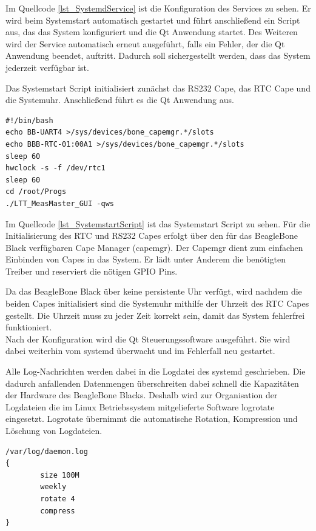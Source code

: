 Im Quellcode \ref{lst_SystemdService} ist die Konfiguration des Services zu sehen. Er wird beim Systemstart automatisch gestartet und führt anschließend ein Script aus, das das System konfiguriert und die Qt Anwendung startet. Des Weiteren wird der Service automatisch erneut ausgeführt, falls ein Fehler, der die Qt Anwendung beendet, auftritt. Dadurch soll sichergestellt werden, dass das System jederzeit verfügbar ist.\ 

Das Systemstart Script initialisiert zunächst das RS232 Cape, das \ac{RTC} Cape und die Systemuhr. Anschließend führt es die Qt Anwendung aus.\\ 

\begin{lstlisting}[caption={Systemstart Script},label=lst_SystemstartScript]
#!/bin/bash
echo BB-UART4 >/sys/devices/bone_capemgr.*/slots
echo BBB-RTC-01:00A1 >/sys/devices/bone_capemgr.*/slots
sleep 60
hwclock -s -f /dev/rtc1
sleep 60
cd /root/Progs
./LTT_MeasMaster_GUI -qws
\end{lstlisting}

Im Quellcode \ref{lst_SystemstartScript} ist das Systemstart Script zu sehen. Für die Initialisierung des RTC und RS232 Capes erfolgt über den für das BeagleBone Black verfügbaren Cape Manager (capemgr). Der Capemgr \cite{Capemgr} dient zum einfachen Einbinden von Capes in das System. Er lädt unter Anderem die benötigten Treiber und reserviert die nötigen \ac{GPIO} Pins.\ 

Da das BeagleBone Black über keine persistente Uhr verfügt, wird nachdem die beiden Capes initialisiert sind die Systemuhr mithilfe der Uhrzeit des RTC Capes gestellt. Die Uhrzeit muss zu jeder Zeit korrekt sein, damit das System fehlerfrei funktioniert.\\
Nach der Konfiguration wird die Qt Steuerungssoftware ausgeführt. Sie wird dabei weiterhin vom systemd überwacht und im Fehlerfall neu gestartet.\ 

Alle Log-Nachrichten werden dabei in die Logdatei des systemd geschrieben. Die dadurch anfallenden Datenmengen überschreiten dabei schnell die Kapazitäten der Hardware des BeagleBone Blacks. Deshalb wird zur Organisation der Logdateien die im Linux Betriebssystem mitgelieferte Software logrotate \cite{logrotate} eingesetzt. Logrotate übernimmt die automatische Rotation, Kompression und Löschung von Logdateien.\\

\begin{lstlisting}[caption={Logrotate},label=lst_Logrotate]
/var/log/daemon.log
{
        size 100M
        weekly
        rotate 4
        compress
}
\end{lstlisting}

